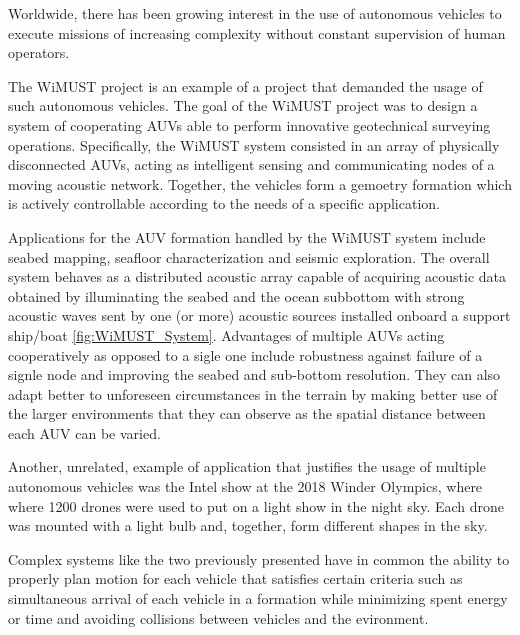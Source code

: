 \par Worldwide, there has been growing interest in the use of autonomous vehicles to execute missions of increasing complexity without constant supervision of human operators. 
\par The WiMUST project \cite{sonar_tec_overview} is an example of a project that demanded the usage of such autonomous vehicles. The goal of the WiMUST project was to design a system of cooperating \acp{AUV} able to perform innovative geotechnical surveying operations. Specifically, the WiMUST system consisted in an array of physically disconnected \acp{AUV}, acting as intelligent sensing and communicating nodes of a moving acoustic network. Together, the vehicles form a gemoetry formation which is actively controllable according to the needs of a specific application. 
\par Applications for the \ac{AUV} formation handled by the WiMUST system include seabed mapping, seafloor characterization and seismic exploration. The overall system behaves as a distributed acoustic array capable of acquiring acoustic data obtained by illuminating the seabed and the ocean subbottom with strong acoustic waves sent by one (or more) acoustic sources installed onboard a support ship/boat \ref{fig:WiMUST_System}. Advantages of multiple \acp{AUV} acting cooperatively as opposed to a sigle one include robustness against failure of a signle node and improving the seabed and sub-bottom resolution. They can also adapt better to unforeseen circumstances in the terrain by making better use of the larger environments that they can observe as the spatial distance between each \ac{AUV} can be varied. 
\par Another, unrelated, example of application that justifies the usage of multiple autonomous vehicles was the Intel show at the 2018 Winder Olympics, where where 1200 drones were used to put on a light show in the night sky. Each drone was mounted with a light bulb and, together, form different shapes in the sky.
\par Complex systems like the two previously presented have in common the ability to properly plan motion for each vehicle that satisfies certain criteria such as simultaneous arrival of each vehicle in a formation while minimizing spent energy or time and avoiding collisions between vehicles and the evironment.
